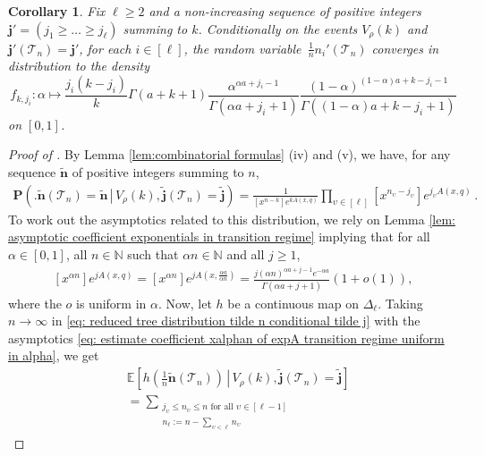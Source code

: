 \documentclass{article}
\newtheorem{corollary}[theorem]{Corollary}
\theoremstyle{remark}
\newcommand{\bN}{\mathbb{N}}
\newcommand{\cT}{\mathcal{T}}
\newcommand{\bj}{\mathbf{j}}
\newcommand{\bn}{\mathbf{n}}
\newcommand{\wbj}{\widetilde{\bj}}
\newcommand{\wbn}{\widetilde{\bn}}
\newcommand{\expecond}[2]{\mathbb{E}{\left[\left. #1 \,\right|\, #2 \right]}}
\newcommand{\probcond}[2]{\mathbf{P}{\left(\left. #1 \,\right|\, #2 \right)}}
\begin{document}
\begin{corollary}\label{cor: asymptotic density of n1 conditional tilde j}
    Fix $\ell\ge2$ and a non-increasing sequence of positive integers $\bj'=(j_1 \ge \dots \ge j_\ell)$ summing to $k$.
    Conditionally on the events $V_\rho(k)$ and $\bj'(\cT_n) = \bj'$, for each $i\in[\ell]$, the random variable~$\frac1n n_i'(\cT_n)$ converges in distribution to the density
    \begin{equation*}
        f_{k,j_i}: \alpha \mapsto \frac{j_i(k-j_i)}{k} \Gamma(a+k+1) \frac{\alpha^{\alpha a+j_i-1}}{\Gamma(\alpha a + j_i +1)} \frac{(1-\alpha)^{(1-\alpha)a+k-j_i-1}}{\Gamma((1-\alpha)a+k-j_i+1)}
    \end{equation*}
    on $[0,1]$.
\end{corollary}

\begin{proof}[Proof of ]
    By Lemma \ref{lem:combinatorial formulas} (iv) and (v), we have, for any sequence $\wbn$ of positive integers summing to $n$,
    \begin{align}\label{eq: reduced tree distribution tilde n conditional tilde j}
        \probcond{\Big.\wbn(\cT_n)=\wbn}{V_\rho(k), \wbj(\cT_n)=\wbj} 
        = \frac{1}{ [x^{n-k}] e^{k A(x,q)} } \prod_{\upsilon\in[\ell]} [x^{n_\upsilon-j_\upsilon}] e^{j_\upsilon A(x,q)} \,.
    \end{align}
    To work out the asymptotics related to this distribution, we rely on Lemma \ref{lem: asymptotic coefficient exponentials in transition regime} implying that for all $\alpha\in[0,1]$, all $n \in \bN$ such that $\alpha n \in \bN$ and all $j\ge1$,
    \begin{align}\label{eq: estimate coefficient xalphan of expA transition regime uniform in alpha}
        [x^{\alpha n}] e^{jA(x,q)} 
        = [x^{\alpha n}] e^{jA(x, \frac{\alpha a}{\alpha n})} 
        = \frac{j (\alpha n)^{\alpha a+j-1} e^{-\alpha a}}{\Gamma(\alpha a+j+1)} \left(1+o(1)\right),
    \end{align}
    where the $o$ is uniform in $\alpha$. Now, let $h$ be a continuous map on $\Delta_\ell$.
    Taking $n\to\infty$ in \eqref{eq: reduced tree distribution tilde n conditional tilde j} with the asymptotics \eqref{eq: estimate coefficient xalphan of expA transition regime uniform in alpha}, we get
    \begin{align*}
        &\expecond{ h{\left(\frac1n\wbn(\cT_n)\right)} }{V_\rho(k), \wbj(\cT_n)=\wbj} 
        \\&= \sum_{\substack{j_\upsilon\le n_\upsilon\le n \text{ for all }\upsilon\in[\ell-1]\\ n_{\ell}:= n- \sum_{\upsilon<\ell} n_\upsilon}}

\end{align*}
\end{proof}
\end{document}
